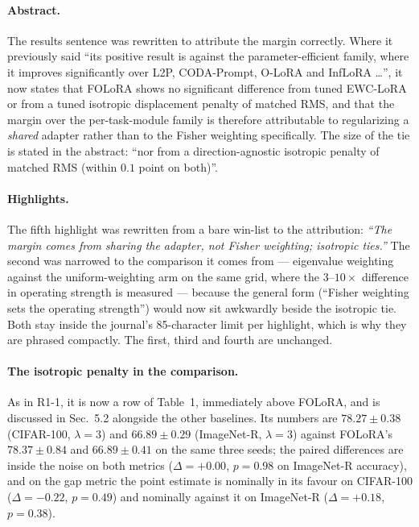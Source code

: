 \paragraph{Abstract.} The results sentence was rewritten to attribute the margin correctly.
Where it previously said ``its positive result is against the parameter-efficient family,
where it improves significantly over L2P, CODA-Prompt, O-LoRA and InfLoRA \ldots'', it now
states that FOLoRA shows no significant difference from tuned EWC-LoRA or from a tuned
isotropic displacement penalty of matched RMS, and that the margin over the per-task-module
family is therefore attributable to regularizing a \emph{shared} adapter rather than to the
Fisher weighting specifically. The size of the tie is stated in the abstract: ``nor from a
direction-agnostic isotropic penalty of matched RMS (within $0.1$ point on both)''.

\paragraph{Highlights.} The fifth highlight was rewritten from a bare win-list to the
attribution: \emph{``The margin comes from sharing the adapter, not Fisher weighting;
isotropic ties.''} The second was narrowed to the comparison it comes from --- eigenvalue
weighting against the uniform-weighting arm on the same grid, where the $3$--$10\times$
difference in operating strength is measured --- because the general form (``Fisher weighting
sets the operating strength'') would now sit awkwardly beside the isotropic tie. Both stay
inside the journal's 85-character limit per highlight, which is why they are phrased
compactly. The first, third and fourth are unchanged.

\paragraph{The isotropic penalty in the comparison.} As in R1-1, it is now a row of
Table~1, immediately above FOLoRA, and is discussed in
Sec.~5.2 alongside the other baselines. Its numbers are
$78.27\pm0.38$ (CIFAR-100, $\lambda{=}3$) and $66.89\pm0.29$ (ImageNet-R, $\lambda{=}3$)
against FOLoRA's $78.37\pm0.84$ and $66.89\pm0.41$ on the same three seeds; the paired
differences are inside the noise on both metrics ($\Delta{=}+0.00$, $p{=}0.98$ on ImageNet-R
accuracy), and on the gap metric the point estimate is nominally in its favour on CIFAR-100
($\Delta{=}-0.22$, $p{=}0.49$) and nominally against it on ImageNet-R ($\Delta{=}+0.18$,
$p{=}0.38$).

